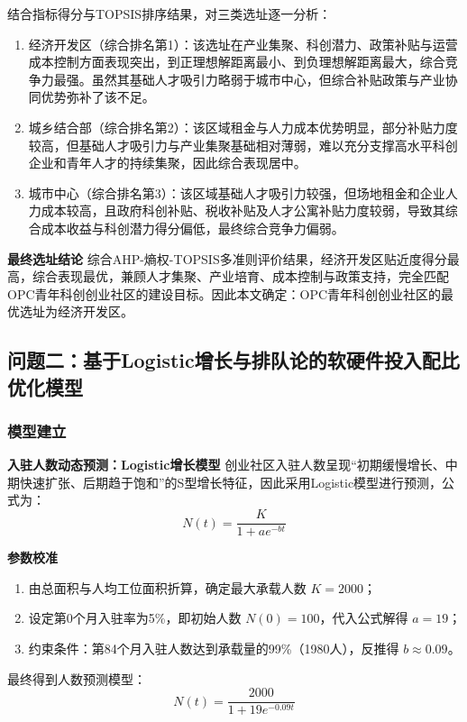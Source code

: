 \documentclass[12pt,a4paper]{article}
\begin{document}
结合指标得分与TOPSIS排序结果，对三类选址逐一分析：

\begin{enumerate}
    \item 经济开发区（综合排名第1）：该选址在产业集聚、科创潜力、政策补贴与运营成本控制方面表现突出，到正理想解距离最小、到负理想解距离最大，综合竞争力最强。虽然其基础人才吸引力略弱于城市中心，但综合补贴政策与产业协同优势弥补了该不足。
    \item 城乡结合部（综合排名第2）：该区域租金与人力成本优势明显，部分补贴力度较高，但基础人才吸引力与产业集聚基础相对薄弱，难以充分支撑高水平科创企业和青年人才的持续集聚，因此综合表现居中。
    \item 城市中心（综合排名第3）：该区域基础人才吸引力较强，但场地租金和企业人力成本较高，且政府科创补贴、税收补贴及人才公寓补贴力度较弱，导致其综合成本收益与科创潜力得分偏低，最终综合竞争力偏弱。
\end{enumerate}

\textbf{最终选址结论}
综合AHP-熵权-TOPSIS多准则评价结果，经济开发区贴近度得分最高，综合表现最优，兼顾人才集聚、产业培育、成本控制与政策支持，完全匹配OPC青年科创创业社区的建设目标。因此本文确定：OPC青年科创创业社区的最优选址为经济开发区。



\subsection{问题二：基于Logistic增长与排队论的软硬件投入配比优化模型}
\subsubsection{模型建立}
\textbf{入驻人数动态预测：Logistic增长模型}
创业社区入驻人数呈现“初期缓慢增长、中期快速扩张、后期趋于饱和”的S型增长特征，因此采用Logistic模型进行预测，公式为：
\begin{equation}
N(t) = \frac{K}{1 + ae^{-bt}}
\end{equation}

\textbf{参数校准}
\begin{enumerate}
    \item 由总面积与人均工位面积折算，确定最大承载人数 $K=2000$；
    \item 设定第0个月入驻率为5\%，即初始人数 $N(0)=100$，代入公式解得 $a=19$；
    \item 约束条件：第84个月入驻人数达到承载量的99\%（1980人），反推得 $b\approx0.09$。
\end{enumerate}

最终得到人数预测模型：
\begin{equation}
N(t) = \frac{2000}{1 + 19e^{-0.09t}}
\end{equation}
\end{document}
